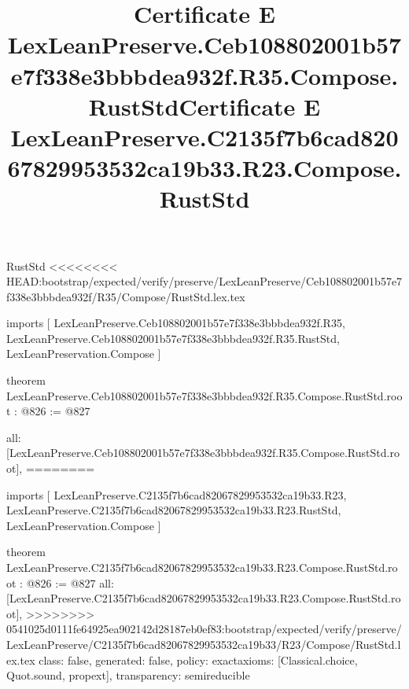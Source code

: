 \begin{lexlean}{RustStd}
<<<<<<<< HEAD:bootstrap/expected/verify/preserve/LexLeanPreserve/Ceb108802001b57e7f338e3bbbdea932f/R35/Compose/RustStd.lex.tex
\title{Certificate E LexLeanPreserve.Ceb108802001b57e7f338e3bbbdea932f.R35.Compose.RustStd}
\begin{coremodule}
imports [
  LexLeanPreserve.Ceb108802001b57e7f338e3bbbdea932f.R35,
  LexLeanPreserve.Ceb108802001b57e7f338e3bbbdea932f.R35.RustStd,
  LexLeanPreservation.Compose
]

theorem LexLeanPreserve.Ceb108802001b57e7f338e3bbbdea932f.R35.Compose.RustStd.root : @826 := @827 {
  all: [LexLeanPreserve.Ceb108802001b57e7f338e3bbbdea932f.R35.Compose.RustStd.root],
========
\title{Certificate E LexLeanPreserve.C2135f7b6cad82067829953532ca19b33.R23.Compose.RustStd}
\begin{coremodule}
imports [
  LexLeanPreserve.C2135f7b6cad82067829953532ca19b33.R23,
  LexLeanPreserve.C2135f7b6cad82067829953532ca19b33.R23.RustStd,
  LexLeanPreservation.Compose
]

theorem LexLeanPreserve.C2135f7b6cad82067829953532ca19b33.R23.Compose.RustStd.root : @826 := @827 {
  all: [LexLeanPreserve.C2135f7b6cad82067829953532ca19b33.R23.Compose.RustStd.root],
>>>>>>>> 0541025d0111fe64925ea902142d28187eb0ef83:bootstrap/expected/verify/preserve/LexLeanPreserve/C2135f7b6cad82067829953532ca19b33/R23/Compose/RustStd.lex.tex
  class: false,
  generated: false,
  policy: exact{axioms: [Classical.choice, Quot.sound, propext]},
  transparency: semireducible
}


\end{coremodule}}
\end{coremodule}
\end{lexlean}
